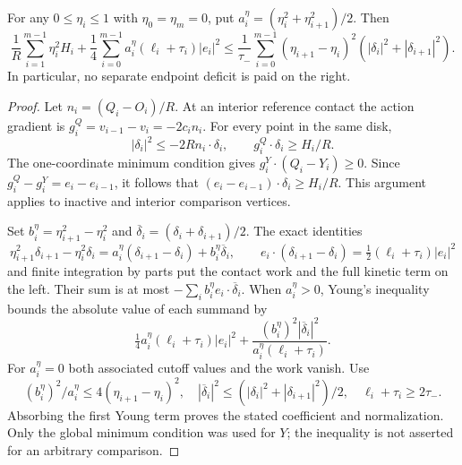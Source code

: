 \begin{lemma}
\label{lem:bl-caccioppoli}
For any $0\le\eta_i\le1$ with $\eta_0=\eta_m=0$, put
$a_i^\eta=(\eta_i^2+\eta_{i+1}^2)/2$.  Then
\begin{equation}\label{eq:bl-caccioppoli}
 \frac1R\sum_{i=1}^{m-1}\eta_i^2H_i
 +\frac14\sum_{i=0}^{m-1}a_i^\eta(\ell_i+\tau_i)|e_i|^2
 \le\frac1{\tau_-}\sum_{i=0}^{m-1}
 (\eta_{i+1}-\eta_i)^2(|\delta_i|^2+|\delta_{i+1}|^2).
\end{equation}
In particular, no separate endpoint deficit is paid on the right.
\end{lemma}
\begin{proof}
Let $n_i=(Q_i-O_i)/R$.  At an interior reference contact the
action gradient is $g_i^Q=v_{i-1}-v_i=-2c_in_i$.
For every point in the same disk,
\[
 |\delta_i|^2\le-2R n_i\cdot\delta_i,
 \qquad g_i^Q\cdot\delta_i\ge H_i/R.
\]
The one-coordinate minimum condition gives
$g_i^Y\cdot(Q_i-Y_i)\ge0$.  Since
$g_i^Q-g_i^Y=e_i-e_{i-1}$, it follows that
$(e_i-e_{i-1})\cdot\delta_i\ge H_i/R$.
This argument applies to inactive and interior comparison vertices.

Set $b_i^\eta=\eta_{i+1}^2-\eta_i^2$ and
$\overline\delta_i=(\delta_i+\delta_{i+1})/2$.  The exact identities
\[
 \eta_{i+1}^2\delta_{i+1}-\eta_i^2\delta_i
 =a_i^\eta(\delta_{i+1}-\delta_i)+b_i^\eta\overline\delta_i,
 \qquad
 e_i\cdot(\delta_{i+1}-\delta_i)
       =\tfrac12(\ell_i+\tau_i)|e_i|^2
\]
and finite integration by parts put the contact work and the full
kinetic term on the left.  Their sum is at most
$-\sum_i b_i^\eta e_i\cdot\overline\delta_i$.
When $a_i^\eta>0$, Young's inequality bounds the absolute value
of each summand by
\[
 \tfrac14a_i^\eta(\ell_i+\tau_i)|e_i|^2+
 \frac{(b_i^\eta)^2|\overline\delta_i|^2}
                         {a_i^\eta(\ell_i+\tau_i)}.
\]
For $a_i^\eta=0$ both associated cutoff values and the work vanish.
Use
\[
 (b_i^\eta)^2/a_i^\eta\le4(\eta_{i+1}-\eta_i)^2,
 \quad |\overline\delta_i|^2
       \le(|\delta_i|^2+|\delta_{i+1}|^2)/2,
 \quad \ell_i+\tau_i\ge2\tau_-.
\]
Absorbing the first Young term proves the stated coefficient and
normalization.  Only the global minimum condition was used for
$Y$; the inequality is not asserted for an arbitrary comparison.
\end{proof}

